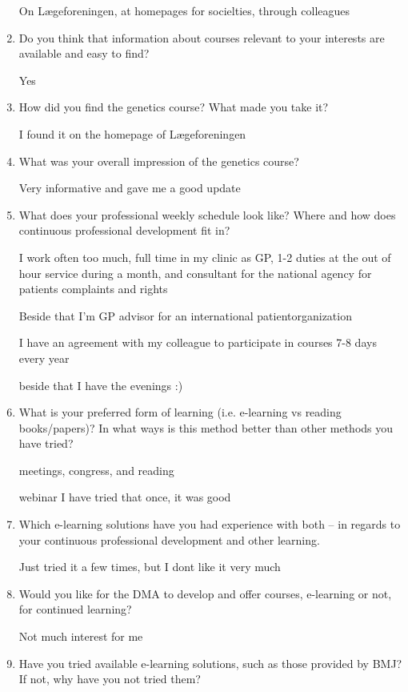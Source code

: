 \begin{appendices}
\begin{enumerate}
On Lægeforeningen, at homepages for socielties, through colleagues

\item Do you think that information about courses relevant to your interests are available and easy to find?

    Yes

\item How did you find the genetics course? What made you take it?

I found it on the homepage of Lægeforeningen

\item What was your overall impression of the genetics course?

    Very informative and gave me a good update

\item What does your professional weekly schedule look like? Where and how does continuous professional development fit in?

I work often too much, full time in my clinic as GP, 1-2 duties at the out of hour service during a month, and consultant for the national agency for patients complaints and rights

Beside that I'm GP advisor for an international patientorganization

I have an agreement with my colleague to participate in  courses 7-8 days every year

beside that I have the evenings :)

\item What is your preferred form of learning (i.e. e-learning vs reading books/papers)? In what ways is this method better than other methods you have tried?

meetings, congress, and reading

webinar I have tried that once, it was good

\item Which e-learning solutions have you had experience with both -- in regards to your continuous professional development and other learning.

Just tried it a few times, but I dont like it very much

\item Would you like for the DMA to develop and offer courses, e-learning or not, for continued learning?

Not much interest for me

\item Have you tried available e-learning solutions, such as those provided by BMJ? If not, why have you not tried them?


\end{enumerate}
\end{appendices}
